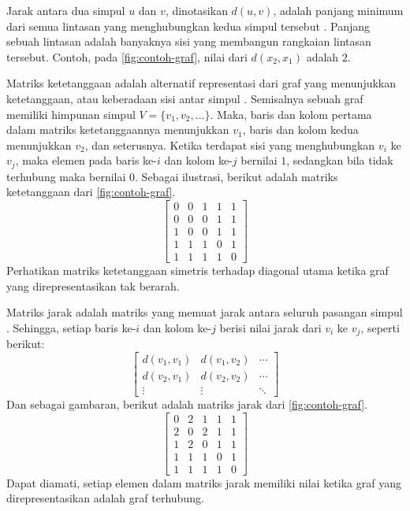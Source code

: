 Jarak antara dua simpul \(u\) dan \(v\), dinotasikan \(d(u, v)\), adalah panjang minimum dari semua lintasan yang menghubungkan kedua simpul tersebut \citep{chartrand2000}. Panjang sebuah lintasan adalah banyaknya sisi yang membangun rangkaian lintasan tersebut. Contoh, pada \autoref{fig:contoh-graf}, nilai dari \(d(x_2, x_1)\) adalah \(2\).

Matriks ketetanggaan adalah alternatif representasi dari graf yang menunjukkan ketetanggaan, atau keberadaan sisi antar simpul \citep{west1996}. Semisalnya sebuah graf memiliki himpunan simpul \(V = \{v_1, v_2, \ldots\}\). Maka, baris dan kolom pertama dalam matriks ketetanggaannya menunjukkan \(v_1\), baris dan kolom kedua menunjukkan \(v_2\), dan seterusnya. Ketika terdapat sisi yang menghubungkan \(v_i\) ke \(v_j\), maka elemen pada baris ke-\(i\) dan kolom ke-\(j\) bernilai \(1\), sedangkan bila tidak terhubung maka bernilai \(0\). Sebagai ilustrasi, berikut adalah matriks ketetanggaan dari \autoref{fig:contoh-graf}.
\[
\left[
\begin{array}{ccccc}
	0 & 0 & 1 & 1 & 1 \\
	0 & 0 & 0 & 1 & 1 \\
	1 & 0 & 0 & 1 & 1 \\
	1 & 1 & 1 & 0 & 1 \\
	1 & 1 & 1 & 1 & 0
\end{array}
\right]
\]
Perhatikan matriks ketetanggaan simetris terhadap diagonal utama ketika graf yang direpresentasikan tak berarah.

Matriks jarak adalah matriks yang memuat jarak antara seluruh pasangan simpul \citep{chartrand2000}. Sehingga, setiap baris ke-\(i\) dan kolom ke-\(j\) berisi nilai jarak dari \(v_i\) ke \(v_j\), seperti berikut:
\[
\left[
\begin{array}{ccc}
	d(v_1, v_1) & d(v_1, v_2) & \cdots \\
	d(v_2, v_1) & d(v_2, v_2) & \cdots \\
	\vdots & \vdots & \ddots
\end{array}
\right]
\]
Dan sebagai gambaran, berikut adalah matriks jarak dari \autoref{fig:contoh-graf}.
\[
\left[
\begin{array}{ccccc}
	0 & 2 & 1 & 1 & 1 \\
	2 & 0 & 2 & 1 & 1 \\
	1 & 2 & 0 & 1 & 1 \\
	1 & 1 & 1 & 0 & 1 \\
	1 & 1 & 1 & 1 & 0
\end{array}
\right]
\]
Dapat diamati, setiap elemen dalam matriks jarak memiliki nilai ketika graf yang direpresentasikan adalah graf terhubung.

